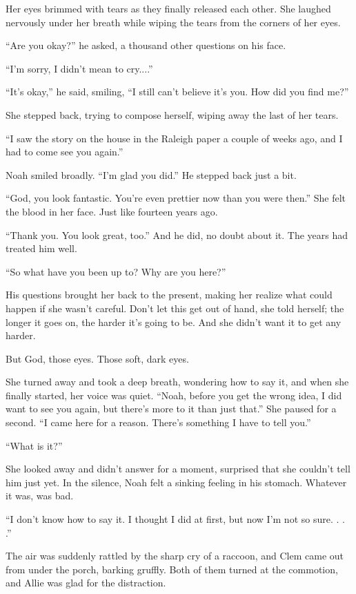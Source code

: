 \documentclass[10pt, twoside, openright]{book}
\begin{document}
Her eyes brimmed with tears as they finally released each other. She
laughed nervously under her breath while wiping the tears from the
corners of her eyes.


``Are you okay?'' he asked, a thousand other questions on his face.

``I'm sorry, I didn't mean to cry....''


``It's okay,'' he said, smiling, ``I still can't believe it's you. How
did you find me?''

She stepped back, trying to compose herself, wiping away the last of her
tears.

``I saw the story on the house in the Raleigh paper a couple of weeks
ago, and I had to come see you again.''


Noah smiled broadly. ``I'm glad you did.'' He stepped back just a bit.


``God, you look fantastic. You're even prettier now than you were
then.'' She felt the blood in her face. Just like fourteen years ago.

``Thank you. You look great, too.'' And he did, no doubt about it. The
years had treated him well.


``So what have you been up to? Why are you here?''


His questions brought her back to the present, making her realize what
could happen if she wasn't careful. Don't let this get out of hand, she
told herself; the longer it goes on, the harder it's going to be. And
she didn't want it to get any harder.


But God, those eyes. Those soft, dark eyes.


She turned away and took a deep breath, wondering how to say it, and
when she finally started, her voice was quiet. ``Noah, before you get
the wrong idea, I did want to see you again, but there's more to it than
just that.'' She paused for a second. ``I came here for a reason.
There's something I have to tell you.''


``What is it?''


She looked away and didn't answer for a moment, surprised that she
couldn't tell him just yet. In the silence, Noah felt a sinking feeling
in his stomach. Whatever it was, was bad.

``I don't know how to say it. I thought I did at first, but now I'm not
so sure. . . .''

The air was suddenly rattled by the sharp cry of a raccoon, and Clem
came out from under the porch, barking gruffly. Both of them turned at
the commotion, and Allie was glad for the distraction.
\end{document}
